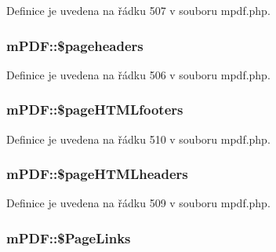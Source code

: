 Definice je uvedena na řádku 507 v souboru mpdf.\-php.

\hypertarget{classm_p_d_f_a118be39bf3d1612c5432d8e6069b0a8a}{
\subsubsection[{\$pageheaders}]{\setlength{\rightskip}{0pt plus 5cm}m\-P\-D\-F\-::\$pageheaders}}\label{classm_p_d_f_a118be39bf3d1612c5432d8e6069b0a8a}


Definice je uvedena na řádku 506 v souboru mpdf.\-php.

\hypertarget{classm_p_d_f_a5e7367783b78c7f55ecaf38135058c30}{
\subsubsection[{\$page\-H\-T\-M\-Lfooters}]{\setlength{\rightskip}{0pt plus 5cm}m\-P\-D\-F\-::\$page\-H\-T\-M\-Lfooters}}\label{classm_p_d_f_a5e7367783b78c7f55ecaf38135058c30}


Definice je uvedena na řádku 510 v souboru mpdf.\-php.

\hypertarget{classm_p_d_f_a709b4a05d67c6acf98fae2f5b10cbddc}{
\subsubsection[{\$page\-H\-T\-M\-Lheaders}]{\setlength{\rightskip}{0pt plus 5cm}m\-P\-D\-F\-::\$page\-H\-T\-M\-Lheaders}}\label{classm_p_d_f_a709b4a05d67c6acf98fae2f5b10cbddc}


Definice je uvedena na řádku 509 v souboru mpdf.\-php.

\hypertarget{classm_p_d_f_a6cabe4ae2977e4c2032b2005104e30aa}{
\subsubsection[{\$\-Page\-Links}]{\setlength{\rightskip}{0pt plus 5cm}m\-P\-D\-F\-::\$\-Page\-Links}}\label{classm_p_d_f_a6cabe4ae2977e4c2032b2005104e30aa}


